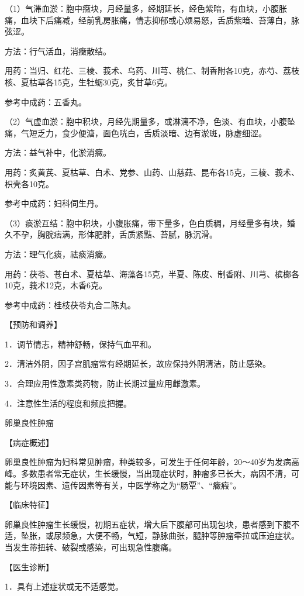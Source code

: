 \documentclass[12pt,UTF8]{ctexbook}
\begin{document}
（1）气滞血淤：胞中癥块，月经量多，经期延长，经色紫暗，有血块，小腹胀痛，血块下后痛减，经前乳房胀痛，情志抑郁或心烦易怒，舌质紫暗、苔薄白，脉弦涩。

方法：行气活血，消癥散结。

用药：当归、红花、三棱、莪术、乌药、川芎、桃仁、制香附各10克，赤芍、荔枝核、夏枯草各15克，生牡蛎30克，炙甘草6克。

参考中成药：五香丸。

（2）气虚血淤：胞中积块，月经先期量多，或淋漓不净，色淡、有血块，小腹坠痛，气短乏力，食少便溏，面色咣白，舌质淡暗、边有淤斑，脉虚细涩。

方法：益气补中，化淤消癥。

用药：炙黄芪、夏枯草、白术、党参、山药、山慈菇、昆布各15克，三棱、莪术、枳壳各10克。

参考中成药：妇科伺生丹。

（3）痰淤互结：胞中积块，小腹胀痛，带下量多，色白质稠，月经量多有块，婚久不孕，胸脘痞满，形体肥胖，舌质紧黠、苔腻，脉沉滑。

方法：理气化痰，祛痰消癥。

用药：茯苓、苍白术、夏枯草、海藻各15克，半夏、陈皮、制香附、川芎、槟榔各10克，莪术12克，木香6克。

参考中成药：桂枝茯苓丸合二陈丸。

【预防和调养】

1．调节情志，精神舒畅，保持气血平和。

2．清洁外阴，因子宫肌瘤常有经期延长，故应保持外阴清洁，防止感染。

3．合理应用性激素类药物，防止长期过量应用雌激素。

4．注意性生活的程度和频度把握。





卵巢良性肿瘤


【病症概述】

卵巢良性肿瘤为妇科常见肿瘤，种类较多，可发生于任何年龄，20～40岁为发病高峰。多数患者常无症状，生长缓慢，当出现症状时，肿瘤多已长大，病因不清，可能与环境因素、遗传因素等有关，中医学称之为“肠覃”、“癥瘕”。

【临床特征】

卵巢良性肿瘤生长缓慢，初期五症状，增大后下腹部可出现包块，患者感到下腹不适，坠胀，或尿频急，大便不畅，气短，静脉曲张，腿肿等肿瘤牵拉或压迫症状。当发生蒂扭转、破裂或感染，可出现急性腹痛。

【医生诊断】

1．具有上述症状或无不适感觉。
\end{document}
